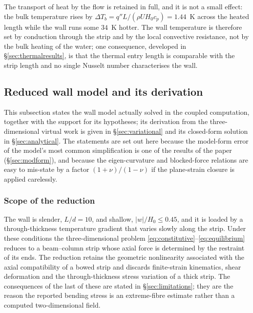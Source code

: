 \documentclass[11pt,a4paper]{article}
\begin{document}
The transport of heat by the flow is retained in full, and it is not a small
effect: the bulk temperature rises by
$\Delta T_b=q''L/(\rho U H_0 c_p)=1.44$~K across the heated length while the
wall runs some $34$~K hotter. The wall temperature is therefore set by
conduction through the strip and by the local convective resistance, not by
the bulk heating of the water; one consequence, developed in
\S\ref{sec:thermalresults}, is that the thermal entry length is comparable
with the strip length and no single Nusselt number characterises the wall.


\subsection{Reduced wall model and its derivation}
\label{sec:wall}

This subsection states the wall model actually solved in the coupled computation,
together with the support for its hypotheses; its derivation from the
three-dimensional virtual work is given in \S\ref{sec:variational} and its closed-form
solution in \S\ref{sec:analytical}. The statements are set out here because the model-form
error of the model's most common simplification is one of the results of the paper
(\S\ref{sec:modform}), and because the eigen-curvature and blocked-force
relations are easy to mis-state by a factor $(1+\nu)/(1-\nu)$ if the
plane-strain closure is applied carelessly.

\subsubsection{Scope of the reduction}
\label{sec:wallmodelscope}

The wall is slender, $L/d=10$, and shallow, $|w|/H_0\le0.45$, and it is
loaded by a through-thickness temperature gradient that varies slowly along
the strip. Under these conditions the three-dimensional problem
\eqref{eq:constitutive}--\eqref{eq:equilibrium} reduces to a beam--column
strip whose axial force is determined by the restraint of its ends. The
reduction retains the geometric nonlinearity associated with the axial
compatibility of a bowed strip and discards finite-strain kinematics, shear
deformation and the through-thickness stress variation of a thick strip. The
consequences of the last of these are stated in \S\ref{sec:limitations}; they
are the reason the reported bending stress is an extreme-fibre estimate
rather than a computed two-dimensional field.
\end{document}
